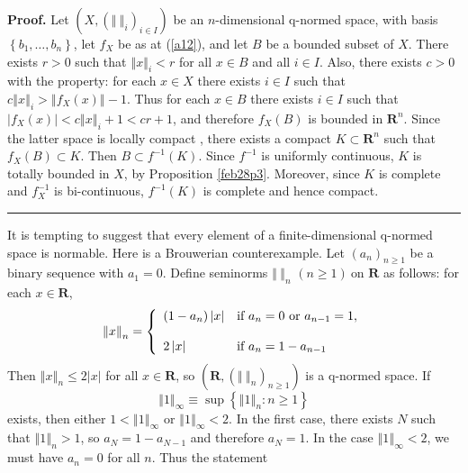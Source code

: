 \documentclass[11pt]{article}%
\newenvironment{proof}[1][Proof]{\noindent\textbf{#1.} }{\ \rule{0.5em}{0.5em}}
\begin{document}
\begin{proof}
Let $\left(  X,\left(  \left\Vert \ \right\Vert _{i}\right)  _{i\in I}\right)
$ be an $n$-dimensional q-normed space, with basis $\left\{  b_{1}%
,\ldots,b_{n}\right\}  $, let $f_{X}$ be as at (\ref{a12}), and let $B$ be a
bounded subset of $X$. There exists $r>0$ such that $\left\Vert x\right\Vert
_{i}<r$ for all $x\in B$ and all $i\in I$. Also, there exists $c>0$ with the
property: for each $x\in X$ there exists $i\in I$ such that $c\left\Vert
x\right\Vert _{i}>\left\Vert f_{X}(x)\right\Vert -1$. Thus for each $x\in B$
there exists $i\in I$ such that $\left\vert f_{X}(x)\right\vert <c\left\Vert
x\right\Vert _{i}+1<cr+1$, and therefore $f_{X}(B)$ is bounded in
$\mathbf{R}^{n}$. Since the latter space is locally compact \cite[4.1.6]%
{BVtech}, there exists a compact $K\subset\mathbf{R}^{n}$ such that
$f_{X}(B)\subset K$. Then $B\subset f^{-1}(K)$. Since $f^{-1}$ is uniformly
continuous, $K$ is totally bounded in $X$, by Proposition \ref{feb28p3}.
Moreover, since $K$ is complete and $f_{X}^{-1}$ is bi-continuous, $f^{-1}(K)$
is complete and hence compact.
\end{proof}

%

\medskip


It is tempting to suggest that every element of a finite-dimensional q-normed
space is normable. Here is a Brouwerian counterexample. Let $\left(
a_{n}\right)  _{n\geq1}$ be a binary sequence with $a_{1}=0$. Define seminorms
$\left\Vert \ \right\Vert _{n}$ $(n\geq1)\ $on $\mathbf{R}$ as follows: for
each $x\in\mathbf{R}$,%
\[
\left\Vert x\right\Vert _{n}=\left\{
\begin{array}
[c]{ll}%
(1-a_{n})\left\vert x\right\vert  & \text{if }a_{n}=0\text{ or }a_{n-1}=1,\\
& \\
2\left\vert x\right\vert  & \text{if }a_{n}=1-a_{n-1}%
\end{array}
\right.
\]
Then $\left\Vert x\right\Vert _{n}\leq2\left\vert x\right\vert $ for all
$x\in\mathbf{R}$, so $\left(  \mathbf{R},\left(  \left\Vert \ \right\Vert
_{n}\right)  _{n\geq1}\right)  $ is a q-normed space. If%
\[
\left\Vert 1\right\Vert _{\infty}\equiv\sup\left\{  \left\Vert 1\right\Vert
_{n}:n\geq1\right\}
\]
exists, then either $1<\left\Vert 1\right\Vert _{\infty}$ or $\left\Vert
1\right\Vert _{\infty}<2$. In the first case, there exists $N$ such that
$\left\Vert 1\right\Vert _{n}>1$, so $a_{N}=1-a_{N-1}$ and therefore $a_{N}%
=1$. In the case $\left\Vert 1\right\Vert _{\infty}<2$, we must have $a_{n}=0$
for all $n$. Thus the statement
\end{document}
